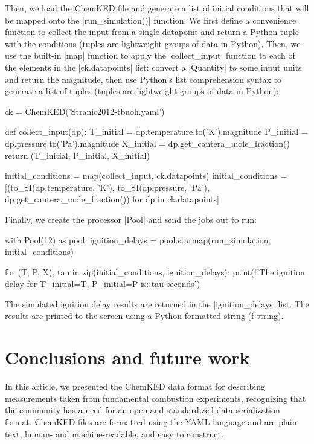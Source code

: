 \documentclass[12pt]{ijck}
\newcommand\ck{ChemKED}
\begin{document}
Then, we load the ChemKED file and generate a list of initial conditions that will be mapped onto
the \pybox|run_simulation()| function. We first define a convenience function to collect the input
from a single datapoint and return a Python tuple with the conditions (tuples are lightweight groups
of data in Python). Then, we use the built-in \pybox|map| function to apply the
\pybox|collect_input| function to each of the elements in the \pybox|ck.datapoints| list: convert a
\pybox|Quantity| to some input units and return the magnitude, then use Python's list comprehension
syntax to generate a list of tuples (tuples are lightweight groups of data in Python):
%
\begin{pythonbox}
ck = ChemKED('Stranic2012-tbuoh.yaml')

def collect_input(dp):
    T_initial = dp.temperature.to('K').magnitude
    P_initial = dp.pressure.to('Pa').magnitude
    X_initial = dp.get_cantera_mole_fraction()
    return (T_initial, P_initial, X_initial)

initial_conditions = map(collect_input, ck.datapoints)
initial_conditions = [(to_SI(dp.temperature, 'K'), to_SI(dp.pressure, 'Pa'), dp.get_cantera_mole_fraction()) for dp in ck.datapoints]
\end{pythonbox}

Finally, we create the processor \pybox|Pool| and send the jobs out to run:
%
\begin{pythonbox}
with Pool(12) as pool:
    ignition_delays = pool.starmap(run_simulation, initial_conditions)

for (T, P, X), tau in zip(initial_conditions, ignition_delays):
    print(f'The ignition delay for T_initial={T}, P_initial={P} is: {tau} seconds')
\end{pythonbox}
%
The simulated ignition delay results are returned in the \pybox|ignition_delays| list. The results
are printed to the screen using a Python formatted string (f-string).
\section{Conclusions and future work}

In this article, we presented the \ck{} data format for describing measurements
taken from fundamental combustion experiments, recognizing that the community
has a need for an open and standardized data serialization format. \ck{} files
are formatted using the YAML language and are plain-text, human- and
machine-readable, and easy to construct.
\end{document}
